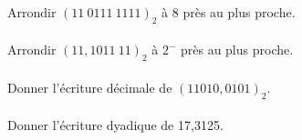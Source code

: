 \documentclass[a4paper,12pt,eval,firamath]{nsi}
\begin{document}
\maketitle


Arrondir $(11\ 0111\ 1111)_2$ à 8 près au plus proche.\\

\\


Arrondir $(11, 1011\ 11)_2$ à $2^{-}$ près au plus proche.\\

\\

Donner l'écriture décimale de $(11010,0101)_2$.\\

\\

Donner l'écriture dyadique de 17,3125.\\

\end{document}
